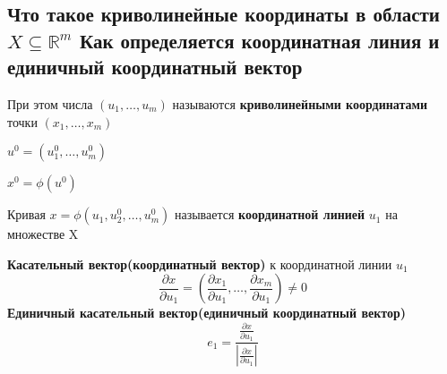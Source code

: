 
\subsection{Что такое криволинейные координаты в области $X\subseteq\mathbb{R}^m$ Как определяется координатная линия и единичный координатный вектор}
\begin{definition*}
	При этом числа $(u_1, \ldots, u_m)$ называются \textbf{криволинейными координатами} точки $(x_1, \ldots, x_m)$
\end{definition*}
\begin{definition*}
    \text{ }
    
    $u^0 = (u_1^0,\ldots,u^0_m)$
    
    $x^0 = \phi(u^0)$
    
	Кривая $x = \phi(u_1, u_2^0,\ldots,u^0_m)$ называется \textbf{координатной линией} $u_1$ на множестве X
\end{definition*}
\begin{definition*}
	\textbf{Касательный вектор(координатный вектор)} к координатной линии $u_1$
	\[\frac{\partial x}{\partial u_1} = (\frac{\partial x_1}{\partial u_1}, \ldots, \frac{\partial x_m}{\partial u_1})\neq 0\]
	\textbf{Единичный касательный вектор(единичный координатный вектор)}
	\[e_1 = \frac{\frac{\partial x}{\partial u_1}}{|\frac{\partial x}{\partial u_1}|}\]
\end{definition*}

